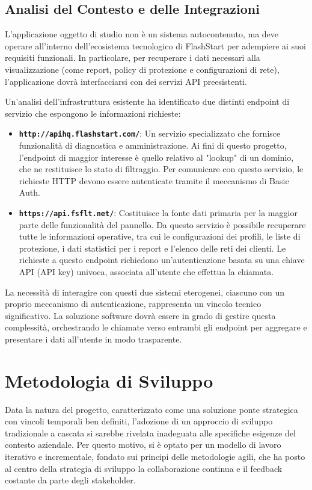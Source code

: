 \documentclass[12pt,a4paper,openright,twoside]{book}
\begin{document}
\section{Analisi del Contesto e delle Integrazioni}
\label{sec:analisi_contesto}
L'applicazione oggetto di studio non è un sistema autocontenuto, ma deve operare all'interno dell'ecosistema tecnologico di FlashStart per adempiere ai suoi requisiti funzionali. In particolare, per recuperare i dati necessari alla visualizzazione (come report, policy di protezione e configurazioni di rete), l'applicazione dovrà interfacciarsi con dei servizi API preesistenti.

Un'analisi dell'infrastruttura esistente ha identificato due distinti endpoint di servizio che espongono le informazioni richieste:
\begin{itemize}
    \item \textbf{\texttt{http://apihq.flashstart.com/}}: Un servizio specializzato che fornisce funzionalità di diagnostica e amministrazione. Ai fini di questo progetto, l'endpoint di maggior interesse è quello relativo al "lookup" di un dominio, che ne restituisce lo stato di filtraggio. Per comunicare con questo servizio, le richieste HTTP devono essere autenticate tramite il meccanismo di Basic Auth.

    \item \textbf{\texttt{https://api.fsflt.net/}}: Costituisce la fonte dati primaria per la maggior parte delle funzionalità del pannello. Da questo servizio è possibile recuperare tutte le informazioni operative, tra cui le configurazioni dei profili, le liste di protezione, i dati statistici per i report e l'elenco delle reti dei clienti. Le richieste a questo endpoint richiedono un'autenticazione basata su una chiave API (API key) univoca, associata all'utente che effettua la chiamata.
\end{itemize}
La necessità di interagire con questi due sistemi eterogenei, ciascuno con un proprio meccanismo di autenticazione, rappresenta un vincolo tecnico significativo. La soluzione software dovrà essere in grado di gestire questa complessità, orchestrando le chiamate verso entrambi gli endpoint per aggregare e presentare i dati all'utente in modo trasparente.

\chapter{Metodologia di Sviluppo}
\label{chap:methodology}

Data la natura del progetto, caratterizzato come una soluzione ponte strategica con vincoli temporali ben definiti, l'adozione di un approccio di sviluppo tradizionale a cascata si sarebbe rivelata inadeguata alle specifiche esigenze del contesto aziendale. Per questo motivo, si è optato per un modello di lavoro iterativo e incrementale, fondato sui principi delle metodologie agili, che ha posto al centro della strategia di sviluppo la collaborazione continua e il feedback costante da parte degli stakeholder.
\end{document}
